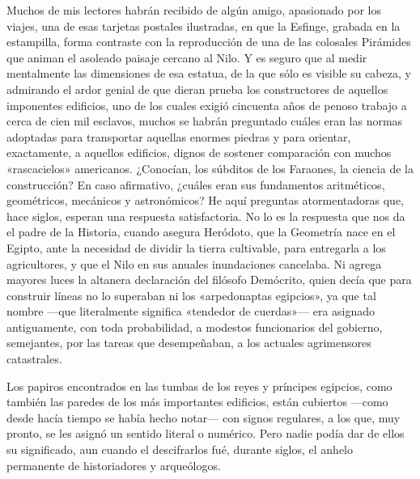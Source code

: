 \documentclass[a4paper, 12pt, draft]{article}
\begin{document}
Muchos de mis lectores habrán recibido de algún amigo, apasionado por los viajes, una de esas tarjetas postales ilustradas, en que la Esfinge, grabada en la estampilla, forma contraste con la reproducción de una de las colosales Pirámides que animan el asoleado paisaje cercano al Nilo. Y es seguro que al medir mentalmente las dimensiones de esa estatua, de la que sólo es visible su cabeza, y admirando el ardor genial de que dieran prueba los constructores de aquellos imponentes edificios, uno de los cuales exigió cincuenta años de penoso trabajo a cerca de cien mil esclavos, muchos se habrán preguntado cuáles eran las normas adoptadas para transportar aquellas enormes piedras y para orientar, exactamente, a aquellos edificios, dignos de sostener comparación con muchos «rascacielos» americanos. ¿Conocían, los súbditos de los Faraones, la ciencia de la construcción? En caso afirmativo, ¿cuáles eran sus fundamentos aritméticos, geométricos, mecánicos y astronómicos? He aquí preguntas atormentadoras que, hace siglos, esperan una respuesta satisfactoria. No lo es la respuesta que nos da el padre de la Historia, cuando asegura Heródoto,
que la Geometría nace en el Egipto, ante la 
necesidad de dividir la tierra cultivable, para entregarla a los agricultores, y que el Nilo en sus anuales inundaciones cancelaba. Ni agrega mayores luces la altanera declaración del filósofo Demócrito, quien decía que para construir líneas no lo superaban ni los «arpedonaptas egipcios», ya que tal nombre
---que literalmente significa «tendedor de cuerdas»--- era asignado antiguamente, con toda probabilidad, a modestos funcionarios del gobierno, semejantes, por las tareas que desempeñaban, a los actuales agrimensores catastrales.



Los papiros encontrados en las tumbas de los reyes y príncipes egipcios, como también las paredes de los más importantes edificios, están cubiertos ---como desde hacía tiempo se había hecho notar--- con signos regulares, a los que, muy pronto, se les asignó un sentido literal o numérico. Pero nadie podía dar de ellos su significado, aun cuando el descifrarlos fué, durante siglos, el anhelo permanente de historiadores y arqueólogos.
\end{document}
